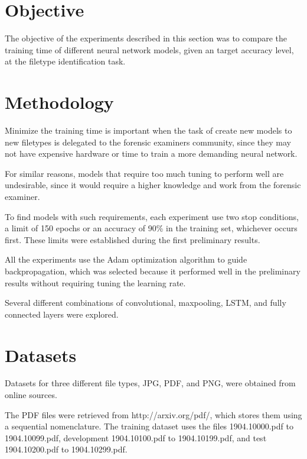 \section{Objective}
The objective of the experiments described in this section 
was to compare the training time of different neural network models, given an target accuracy level, at the filetype identification task.

\section{Methodology}

Minimize the training time is important when the task of create new models to new filetypes is delegated to the forensic examiners community, since they may not have expensive hardware or time to train a more demanding neural network.

For similar reasons, models that require too much tuning to perform well are undesirable, since it would require a higher knowledge and work from the forensic examiner.


To find models with such requirements, each experiment use two stop conditions, a limit of 150 epochs or an accuracy of 90\% in the training set, whichever occurs first. These limits were established during the first preliminary results. 

All the experiments use the Adam
optimization algorithm to guide backpropagation, which was selected because it performed well in the preliminary results without requiring tuning the learning rate.

Several different combinations of convolutional, maxpooling, LSTM, and fully connected layers were explored.


\section{Datasets}

Datasets for three different file types, JPG, PDF, and PNG, were obtained from online sources.

The PDF files were retrieved from http://arxiv.org/pdf/, which stores them using a sequential nomenclature. The training dataset uses the files 1904.10000.pdf to 1904.10099.pdf, development 1904.10100.pdf to 1904.10199.pdf, and test 1904.10200.pdf to 1904.10299.pdf. 

